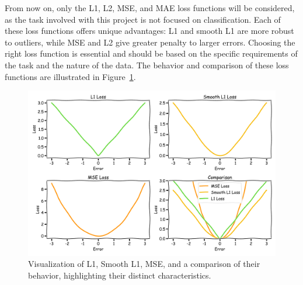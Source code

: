 From now on, only the L1, L2, MSE, and MAE loss functions will be considered, as the task involved with this project is not focused on classification. Each of these loss functions offers unique advantages: L1 and smooth L1 are more robust to outliers, while MSE and L2 give greater penalty to larger errors. Choosing the right loss function is essential and should be based on the specific requirements of the task and the nature of the data. The behavior and comparison of these loss functions are illustrated in Figure~\ref{fig:loss-functions}.
\begin{figure}[H]
    \centering
    \includegraphics[width=1\linewidth]{LateX/figs/loss_functions_xkcd.pdf}
    \caption{Visualization of L1, Smooth L1, MSE, and a comparison of their behavior, highlighting their distinct characteristics.}
    \label{fig:loss-functions}
\end{figure}

